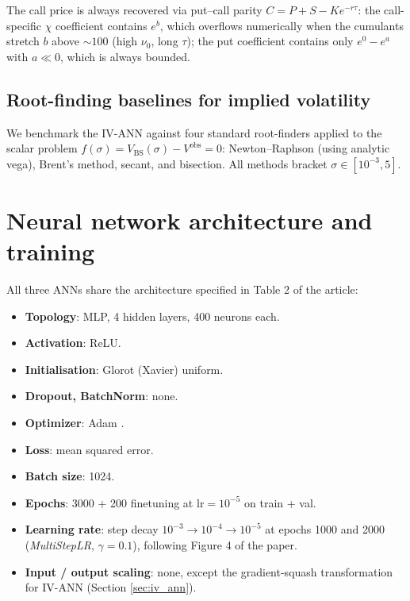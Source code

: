 \documentclass[11pt,a4paper]{article}
\newcommand{\bs}{\mathrm{BS}}
\begin{document}
The call price is always recovered via put--call parity
$C = P + S - K e^{-r\tau}$: the call-specific $\chi$ coefficient contains
$e^{b}$, which overflows numerically when the cumulants stretch $b$ above
$\sim 100$ (high $\nu_0$, long $\tau$); the put coefficient contains only
$e^{0} - e^{a}$ with $a \ll 0$, which is always bounded.

\subsection{Root-finding baselines for implied volatility}

We benchmark the IV-ANN against four standard root-finders applied to the
scalar problem $f(\sigma) = V_{\bs}(\sigma) - V^{\text{obs}} = 0$:
Newton--Raphson (using analytic vega),
Brent's method, secant, and bisection. All methods bracket $\sigma \in [10^{-3}, 5]$.

\section{Neural network architecture and training}
\label{sec:ann}

All three ANNs share the architecture specified in Table 2 of the article:

\begin{itemize}
    \item \textbf{Topology}: MLP, 4 hidden layers, 400 neurons each.
    \item \textbf{Activation}: ReLU.
    \item \textbf{Initialisation}: Glorot (Xavier) uniform.
    \item \textbf{Dropout, BatchNorm}: none.
    \item \textbf{Optimizer}: Adam \cite{kingma2014}.
    \item \textbf{Loss}: mean squared error.
    \item \textbf{Batch size}: 1024.
    \item \textbf{Epochs}: 3000 + 200 finetuning at $\mathrm{lr}=10^{-5}$ on
    train + val.
    \item \textbf{Learning rate}: step decay $10^{-3} \to 10^{-4} \to 10^{-5}$
    at epochs 1000 and 2000 (\emph{MultiStepLR}, $\gamma=0.1$), following
    Figure 4 of the paper.
    \item \textbf{Input / output scaling}: none, except the gradient-squash
    transformation for IV-ANN (Section \ref{sec:iv_ann}).
\end{itemize}
\end{document}
